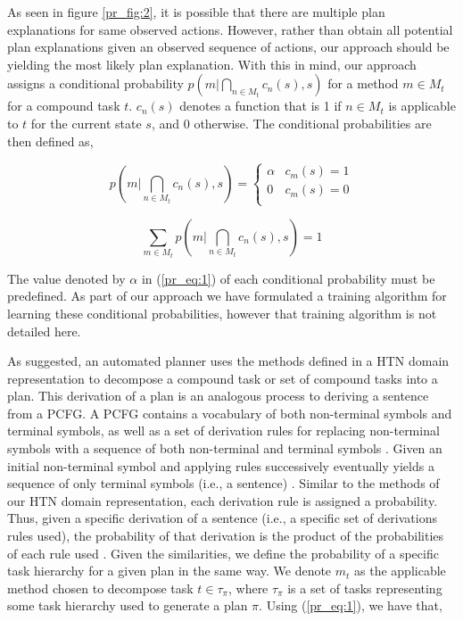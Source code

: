 As seen in figure \ref{pr_fig:2}, it is possible that there are multiple plan explanations for same observed actions. However, rather than obtain all potential plan explanations given an observed sequence of actions, our approach should be yielding the most likely plan explanation. With this in mind, our approach assigns a conditional probability $p(m | \bigcap_{n \in M_t} c_n(s), s)$ for a method $m \in M_t$ for a compound task $t$. $c_n(s)$ denotes a function that is 1 if $n \in M_t$ is applicable to $t$ for the current state $s$, and 0 otherwise. The conditional probabilities are then defined as,

\begin{equation} \label{pr_eq:1}
p(m | \bigcap_{n \in M_t} c_n(s), s) = \begin{cases} \alpha  & c_m(s) = 1 \\ 0 & c_m(s) = 0 \\ \end{cases}
\end{equation}

\begin{equation}  \label{pr_eq:2}
\sum_{m \in M_t} p(m | \bigcap_{n \in M_t} c_n(s), s) = 1
\end{equation}

The value denoted by $\alpha$ in (\ref{pr_eq:1}) of each conditional probability must be predefined. As part of our approach we have formulated a training algorithm for learning these conditional probabilities, however that training algorithm is not detailed here. 

As suggested, an automated planner uses the methods defined in a HTN domain representation to decompose a compound task or set of compound tasks into a plan. This derivation of a plan is an analogous process to deriving a sentence from a PCFG. A PCFG contains a vocabulary of both non-terminal symbols and terminal symbols, as well as a set of derivation rules for replacing non-terminal symbols with a sequence of both non-terminal and terminal symbols \citep{Collins_2011}. Given an initial non-terminal symbol and applying rules successively eventually yields a sequence of only terminal symbols (i.e., a sentence) \citep{Collins_2011}. Similar to the methods of our HTN domain representation, each derivation rule is assigned a probability. Thus, given a specific derivation of a sentence (i.e., a specific set of derivations rules used), the probability of that derivation is the product of the probabilities of each rule used \citep{Collins_2011}. Given the similarities, we define the probability of a specific task hierarchy for a given plan in the same way. We denote $m_t$ as the applicable method chosen to decompose task $t \in \tau_\pi$, where $\tau_\pi$ is a set of tasks representing some task hierarchy used to generate a plan $\pi$. Using (\ref{pr_eq:1}), we have that,

